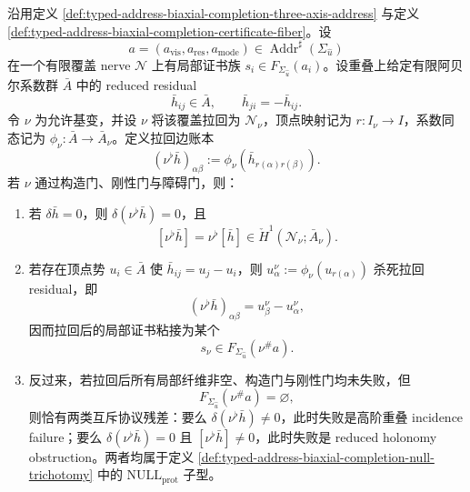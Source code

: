 \begin{theorem}[三轴证书纤维的基变下降与协议残差分类]\label{distill:grothendieck-relative_certificate_base_change_stability-typed-address-fiber-descent-residue}
沿用定义 \ref{def:typed-address-biaxial-completion-three-axis-address} 与定义 \ref{def:typed-address-biaxial-completion-certificate-fiber}。设
\[
a=(a_{\mathrm{vis}},a_{\mathrm{res}},a_{\mathrm{mode}})\in\operatorname{Addr}^{\sharp}(\Sigma_{\hat u})
\]
在一个有限覆盖 nerve \(\mathcal N\) 上有局部证书族 \(s_i\in F_{\Sigma_{\hat u}}(a_i)\)。设重叠上给定有限阿贝尔系数群 \(\bar A\) 中的 reduced residual
\[
\bar h_{ij}\in \bar A,\qquad \bar h_{ji}=-\bar h_{ij}.
\]
令 \(\nu\) 为允许基变，并设 \(\nu\) 将该覆盖拉回为 \(\mathcal N_\nu\)，顶点映射记为 \(r:I_\nu\to I\)，系数同态记为 \(\phi_\nu:\bar A\to\bar A_\nu\)。定义拉回边账本
\[
(\nu^\flat\bar h)_{\alpha\beta}:=\phi_\nu(\bar h_{r(\alpha)r(\beta)}).
\]
若 \(\nu\) 通过构造门、刚性门与障碍门，则：
\begin{enumerate}
  \item 若 \(\delta\bar h=0\)，则 \(\delta(\nu^\flat\bar h)=0\)，且
  \[
  [\nu^\flat\bar h]=\nu^\flat[\bar h]\in \check H^1(\mathcal N_\nu;\bar A_\nu).
  \]
  \item 若存在顶点势 \(u_i\in\bar A\) 使 \(\bar h_{ij}=u_j-u_i\)，则 \(u_\alpha^\nu:=\phi_\nu(u_{r(\alpha)})\) 杀死拉回 residual，即
  \[
  (\nu^\flat\bar h)_{\alpha\beta}=u_\beta^\nu-u_\alpha^\nu,
  \]
  因而拉回后的局部证书粘接为某个
  \[
  s_\nu\in F_{\Sigma_{\hat u}}(\nu^\#a).
  \]
  \item 反过来，若拉回后所有局部纤维非空、构造门与刚性门均未失败，但
  \[
  F_{\Sigma_{\hat u}}(\nu^\#a)=\varnothing,
  \]
  则恰有两类互斥协议残差：要么 \(\delta(\nu^\flat\bar h)\ne0\)，此时失败是高阶重叠 incidence failure；要么 \(\delta(\nu^\flat\bar h)=0\) 且 \([\nu^\flat\bar h]\ne0\)，此时失败是 reduced holonomy obstruction。两者均属于定义 \ref{def:typed-address-biaxial-completion-null-trichotomy} 中的 \(\mathrm{NULL}_{\mathrm{prot}}\) 子型。
\end{enumerate}
\end{theorem}
